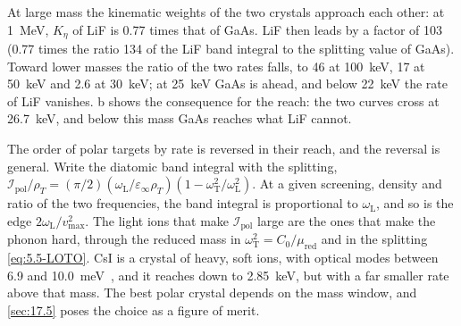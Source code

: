 At large mass the kinematic weights of the two crystals approach each other: at \SI{1}{MeV}, $K_\eta$ of LiF is 0.77 times that of GaAs. LiF then leads by a factor of 103 (0.77 times the ratio 134 of the LiF band integral to the splitting value of GaAs). Toward lower masses the ratio of the two rates falls, to 46 at \SI{100}{keV}, 17 at \SI{50}{keV} and 2.6 at \SI{30}{keV}; at \SI{25}{keV} GaAs is ahead, and below \SI{22}{keV} the rate of LiF vanishes. b shows the consequence for the reach: the two curves cross at \SI{26.7}{keV}, and below this mass GaAs reaches what LiF cannot.

The order of polar targets by rate is reversed in their reach, and the reversal is general. Write the diatomic band integral with the splitting, $\mathcal{I}_{\mathrm{pol}}/\rho_T = (\pi/2)(\omega_{\mathrm{L}}/\varepsilon_\infty\rho_T)(1 - \omega_{\mathrm{T}}^2/\omega_{\mathrm{L}}^2)$. At a given screening, density and ratio of the two frequencies, the band integral is proportional to $\omega_{\mathrm{L}}$, and so is the edge $2\omega_{\mathrm{L}}/v_{\mathrm{max}}^2$. The light ions that make $\mathcal{I}_{\mathrm{pol}}$ large are the ones that make the phonon hard, through the reduced mass in $\omega_{\mathrm{T}}^2 = C_0/\mu_{\mathrm{red}}$ and in the splitting \cref{eq:5.5-LOTO}. CsI is a crystal of heavy, soft ions, with optical modes between 6.9 and \SI{10.0}{meV}~\cite[Table~I]{griffin2020multichannel}, and it reaches down to \SI{2.85}{keV}, but with a far smaller rate above that mass. The best polar crystal depends on the mass window, and \cref{sec:17.5} poses the choice as a figure of merit.

